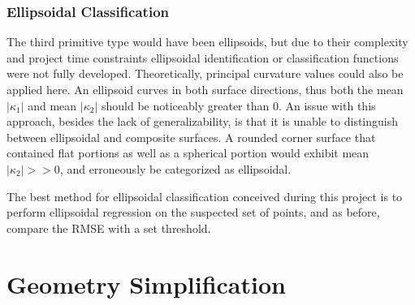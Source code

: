 \subsubsection{Ellipsoidal Classification}
The third primitive type would have been ellipsoids, but due to their complexity and project time constraints ellipsoidal identification or classification functions were not fully developed.
Theoretically, principal curvature values could also be applied here.
An ellipsoid curves in both surface directions, thus both the mean $|\kappa_1|$ and mean $|\kappa_2|$ should be noticeably greater than 0.
An issue with this approach, besides the lack of generalizability, is that it is unable to distinguish between ellipsoidal and composite surfaces.
A rounded corner surface that contained flat portions as well as a spherical portion would exhibit mean $|\kappa_2| >> 0$, and erroneously be categorized as ellipsoidal.

The best method for ellipsoidal classification conceived during this project is to perform ellipsoidal regression on the suspected set of points, and as before, compare the RMSE with a set threshold.

\section{Geometry Simplification}

